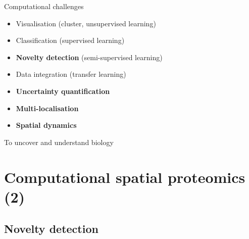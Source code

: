 \documentclass{beamer}
\theoremstyle{example}
\begin{document}
\begin{frame}{Computational challenges}

  \begin{itemize}
  \item Visualisation (cluster, unsupervised learning)
  \item Classification (supervised learning)
  \item \textbf{Novelty detection} (semi-supervised learning)
  \item Data integration (transfer learning)
  \item \textbf{Uncertainty quantification}
  \item \textbf{Multi-localisation}
  \item \textbf{Spatial dynamics}
  \end{itemize}
  \centering

  \bigskip

  {\Large To uncover and understand biology}
\end{frame}



\section{Computational spatial proteomics (2)}

\subsection{Novelty detection}
\end{document}
